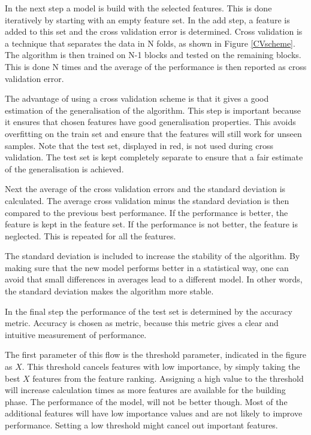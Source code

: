 \npar

In the next step a model is build with the selected features. This is done iteratively by starting with an empty feature set. In the add step, a feature is added to this set and the cross validation error is determined. Cross validation is a technique that separates the data in N folds, as shown in Figure \ref{CVscheme}. The algorithm is then trained on N-1 blocks and tested on the remaining blocks. This is done N times and the average of the performance is then reported as cross validation error. 


The advantage of using a cross validation scheme is that it gives a good estimation of the generalisation of the algorithm. This step is important because it ensures that chosen features have good generalisation properties. This avoids overfitting on the train set and ensure that the features will still work for unseen samples. Note that the test set, displayed in red, is not used during cross validation. The test set is kept completely separate to ensure that a fair estimate of the generalisation is achieved.

\npar

Next the average of the cross validation errors and the standard deviation is calculated. The average cross validation minus the standard deviation is then compared to the previous best performance. If the performance is better, the feature is kept in the feature set. If the performance is not better, the feature is neglected. This is repeated for all the features. 

\npar

The standard deviation is included to increase the stability of the algorithm. By making sure that the new model performs better in a statistical way, one can avoid that small differences in averages lead to a different model. In other words, the standard deviation makes the algorithm more stable.

\npar

In the final step the performance of the test set is determined by the accuracy metric. Accuracy is chosen as metric, because this metric gives a clear and intuitive measurement of performance.

\npar

The first parameter of this flow is the threshold parameter, indicated in the figure as $X$. This threshold cancels features with low importance, by simply taking the best $X$ features from the feature ranking. Assigning a high value to the threshold will increase calculation times as more features are available for the building phase. The performance of the model, will not be better though. Most of the additional features will have low importance values and are not likely to improve performance. Setting a low threshold might cancel out important features. 

